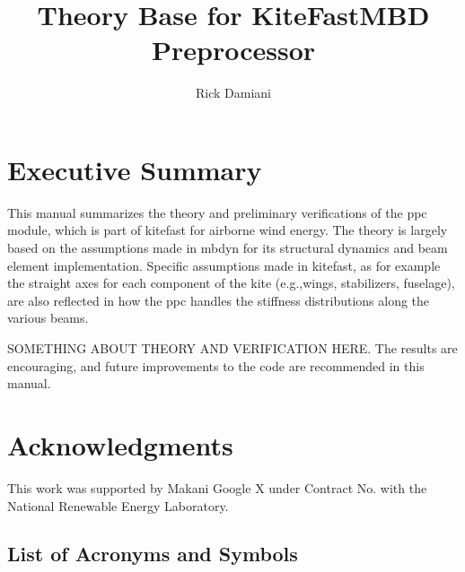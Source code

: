 \documentclass[report]{nrel}
\author{Rick Damiani}
\title{Theory Base for KiteFastMBD Preprocessor}
\let\firstchar\lowercase
\let\oldprintglossary\printglossary
\def\printglossary{\let\firstchar\uppercase\oldprintglossary}
\def\eg{e.g., }
\def\eg{e.g.,}
\begin{document}
\glsdisablehyper

\frontmatter
\setcounter{page}{4}
\chapter*{Executive Summary}
This manual summarizes the theory and preliminary verifications of the \gls{ppc} module, which is part of \gls{kitefast} for airborne wind energy. 
The theory is largely based on the assumptions made in \gls{mbdyn} for its structural dynamics and beam element implementation. Specific assumptions made in \gls{kitefast}, as for example the straight axes for each component of the kite (\eg wings, stabilizers, fuselage), are also reflected in how the \gls{ppc} handles the stiffness distributions along the various beams.

  SOMETHING ABOUT THEORY AND VERIFICATION HERE. The results are encouraging, and future improvements to the code are recommended in this manual. 
\chapter*{Acknowledgments}
This work was supported by Makani Google X  under Contract No. with the National Renewable Energy Laboratory. 

\glsresetall


\tableofcontents

\listoffigures
\listoftables
\section*{\Large{List of Acronyms and Symbols}}\label{sec:symbols}
\printglossary[type=\acronymtype,style=long]
\printglossary[type=symbols,style=long, title=Symbols]
\printglossary[type=greek,style=long, title=Greek Symbols]
\let\firstchar\lowercase %

\mainmatter
\lstset{language=[LaTeX]Tex,columns=fullflexible,keepspaces=true,breaklines=true}




\end{document}
